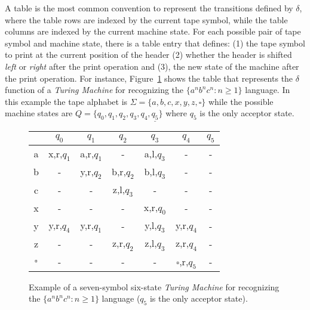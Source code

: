 \documentclass[letterpaper]{article} %
\begin{document}
A table is the most common convention to represent the transitions defined by $\delta$, where the table rows are indexed by the current tape symbol, while the table columns are indexed by the current machine state. For each possible pair of tape symbol and machine state, there is a table entry that defines: (1) the tape symbol to print at the current position of the header (2) whether the header is shifted {\em left} or {\em right} after the print operation and (3), the new state of the machine after the print operation. For instance, Figure~\ref{tab:tm-anbncn} shows the table that represents the $\delta$ function of a {\em Turing Machine} for recognizing the $\{a^nb^nc^n : n \geq 1 \}$ language. In this example the tape alphabet is $\Sigma=\{a,b,c,x,y,z,\square\}$ while the possible machine states are $Q=\{q_0,q_1,q_2,q_3,q_4,\underline{q_5}\}$ where \underline{$q_5$} is the only acceptor state.

\begin{figure}
\begin{center}
    \begin{tabular}{| c | c | c | c | c | c | c |}
    \hline
      & $q_0$ & $q_1$ & $q_2$ & $q_3$ & $q_4$ & \underline{$q_5$} \\ \hline
    a & x,r,$q_1$ & a,r,$q_1$ & - &  a,l,$q_3$ & - & - \\ \hline
    b & - & y,r,$q_2$ & b,r,$q_2$ & b,l,$q_3$ & - & - \\ \hline
    c & - & - & z,l,$q_3$ & - & - & - \\ \hline
    x & - & - & - & x,r,$q_0$ & - & - \\ \hline
    y & y,r,$q_4$ & y,r,$q_1$ & - & y,l,$q_3$ & y,r,$q_4$ & - \\ \hline
    z & - & - & z,r,$q_2$ & z,l,$q_3$ & z,r,$q_4$ & - \\\hline
    $\square$ & - & - & - & - & $\square$,r,$q_5$  & - \\                
    \hline
    \end{tabular}
\end{center}
  \caption{\small Example of a seven-symbol six-state {\em Turing Machine} for recognizing the $\{a^nb^nc^n : n \geq 1 \}$ language (\underline{$q_5$} is the only acceptor state).}
  \label{tab:tm-anbncn}
\end{figure}
\end{document}
